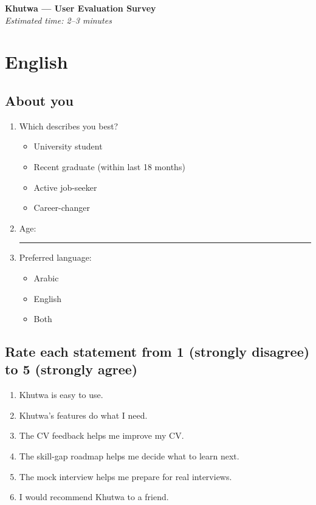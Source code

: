 ﻿\documentclass[11pt]{article}
\begin{document}
\begin{center}
  {\huge\bfseries Khutwa --- User Evaluation Survey}\\[6pt]
  \emph{Estimated time: 2--3 minutes}
\end{center}

\vspace{1em}

\section*{English}

\subsection*{About you}

\begin{enumerate}
  \item Which describes you best?
    \begin{itemize}
      \item[$\square$] University student
      \item[$\square$] Recent graduate (within last 18 months)
      \item[$\square$] Active job-seeker
      \item[$\square$] Career-changer
    \end{itemize}
  \item Age: \rule{4cm}{0.4pt}
  \item Preferred language:
    \begin{itemize}
      \item[$\square$] Arabic \quad
      \item[$\square$] English \quad
      \item[$\square$] Both
    \end{itemize}
\end{enumerate}

\subsection*{Rate each statement from 1 (strongly disagree) to 5 (strongly agree)}

\begin{enumerate}[start=4]
  \item Khutwa is easy to use. \hfill {}    
  \item Khutwa's features do what I need. \hfill {}    
  \item The CV feedback helps me improve my CV. \hfill {}    
  \item The skill-gap roadmap helps me decide what to learn next. \hfill {}    
  \item The mock interview helps me prepare for real interviews. \hfill {}    
  \item I would recommend Khutwa to a friend. \hfill {}    
\end{enumerate}
\end{document}
